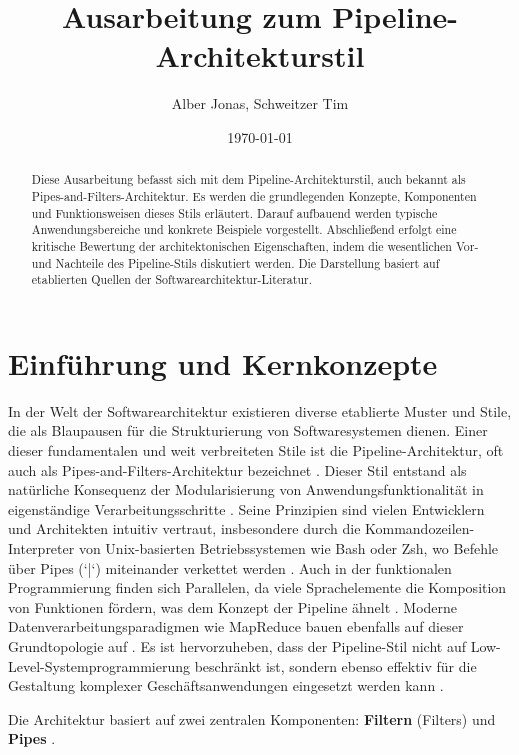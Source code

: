 \documentclass[11pt, a4paper]{article}
\title{Ausarbeitung zum Pipeline-Architekturstil}
\author{Alber Jonas, Schweitzer Tim}
\date{\today}
\begin{document}
\maketitle

\begin{abstract}
\noindent Diese Ausarbeitung befasst sich mit dem Pipeline-Architekturstil, auch bekannt als Pipes-and-Filters-Architektur. Es werden die grundlegenden Konzepte, Komponenten und Funktionsweisen dieses Stils erläutert. Darauf aufbauend werden typische Anwendungsbereiche und konkrete Beispiele vorgestellt. Abschließend erfolgt eine kritische Bewertung der architektonischen Eigenschaften, indem die wesentlichen Vor- und Nachteile des Pipeline-Stils diskutiert werden. Die Darstellung basiert auf etablierten Quellen der Softwarearchitektur-Literatur.
\end{abstract}

\tableofcontents
\newpage

\section{Einführung und Kernkonzepte}

In der Welt der Softwarearchitektur existieren diverse etablierte Muster und Stile, die als Blaupausen für die Strukturierung von Softwaresystemen dienen. Einer dieser fundamentalen und weit verbreiteten Stile ist die Pipeline-Architektur, oft auch als Pipes-and-Filters-Architektur bezeichnet \cite{RichardsFord2020}. Dieser Stil entstand als natürliche Konsequenz der Modularisierung von Anwendungsfunktionalität in eigenständige Verarbeitungsschritte \cite{RichardsFord2020}. Seine Prinzipien sind vielen Entwicklern und Architekten intuitiv vertraut, insbesondere durch die Kommandozeilen-Interpreter von Unix-basierten Betriebssystemen wie Bash oder Zsh, wo Befehle über Pipes (`|`) miteinander verkettet werden \cite{RichardsFord2020}. Auch in der funktionalen Programmierung finden sich Parallelen, da viele Sprachelemente die Komposition von Funktionen fördern, was dem Konzept der Pipeline ähnelt \cite{RichardsFord2020}. Moderne Datenverarbeitungsparadigmen wie MapReduce bauen ebenfalls auf dieser Grundtopologie auf \cite{RichardsFord2020}. Es ist hervorzuheben, dass der Pipeline-Stil nicht auf Low-Level-Systemprogrammierung beschränkt ist, sondern ebenso effektiv für die Gestaltung komplexer Geschäftsanwendungen eingesetzt werden kann \cite{RichardsFord2020}.

Die Architektur basiert auf zwei zentralen Komponenten: \textbf{Filtern} (Filters) und \textbf{Pipes} \cite{RichardsFord2020}.
\end{document}
